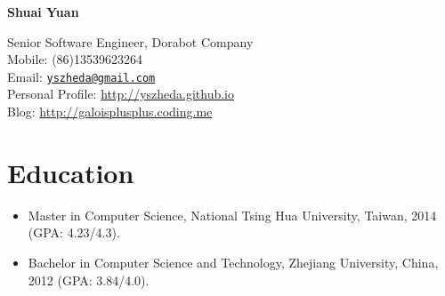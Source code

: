 \documentclass[letterpaper]{article}
\def\name{Shuai Yuan}
\begin{document}
\centerline{\huge\bf \name} \vspace{0.25in}
\begin{minipage}[t]{0.8\textwidth}
    Senior Software Engineer, Dorabot Company \\
    Mobile: (86)13539623264   \\
    Email: \href{mailto:yszheda@gmail.com}{\tt yszheda@gmail.com}\\
    Personal Profile: \url{http://yszheda.github.io} \\
    Blog: \url{http://galoisplusplus.coding.me}
\end{minipage}

\section*{Education}
\begin{itemize}
    \item Master in Computer Science, National Tsing Hua University, Taiwan, 2014 (GPA: 4.23/4.3).
    \item Bachelor in Computer Science and Technology, Zhejiang University, China, 2012 (GPA: 3.84/4.0).
\end{itemize}
\end{document}
